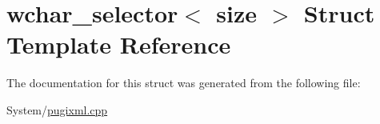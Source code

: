 \hypertarget{structwchar__selector}{\section{wchar\-\_\-selector$<$ size $>$ Struct Template Reference}
\label{structwchar__selector}
}


The documentation for this struct was generated from the following file\-:\begin{DoxyCompactItemize}
\item 
System/\hyperlink{pugixml_8cpp}{pugixml.\-cpp}\end{DoxyCompactItemize}
